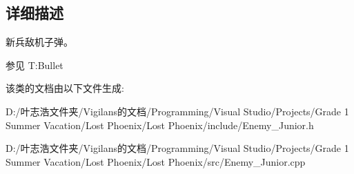 \subsection{详细描述}
新兵敌机子弹。 

\begin{DoxySeeAlso}{参见}
T\+:\+Bullet


\end{DoxySeeAlso}


该类的文档由以下文件生成\+:\begin{DoxyCompactItemize}
\item 
D\+:/叶志浩文件夹/\+Vigilans的文档/\+Programming/\+Visual Studio/\+Projects/\+Grade 1 Summer Vacation/\+Lost Phoenix/\+Lost Phoenix/include/Enemy\+\_\+\+Junior.\+h\item 
D\+:/叶志浩文件夹/\+Vigilans的文档/\+Programming/\+Visual Studio/\+Projects/\+Grade 1 Summer Vacation/\+Lost Phoenix/\+Lost Phoenix/src/Enemy\+\_\+\+Junior.\+cpp\end{DoxyCompactItemize}
